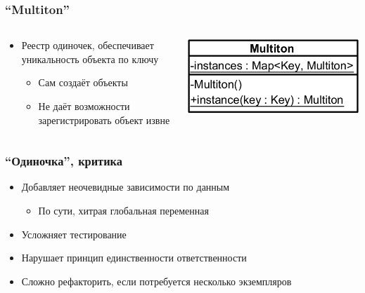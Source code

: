 \documentclass{../cscslides}
\begin{document}
    \begin{frame}
        \frametitle{``Multiton''}
        \begin{columns}
            \begin{column}{0.6\textwidth}
                \begin{itemize}
                    \item Реестр одиночек, обеспечивает уникальность объекта по ключу
                    \begin{itemize}
                        \item Сам создаёт объекты
                        \item Не даёт возможности зарегистрировать объект извне
                    \end{itemize}
                \end{itemize}
            \end{column}
            \begin{column}{0.4\textwidth}
                \includegraphics[width=\textwidth]{multiton.png}
            \end{column}
        \end{columns}
    \end{frame}

    \begin{frame}
        \frametitle{``Одиночка'', критика}
        \begin{itemize}
            \item Добавляет неочевидные зависимости по данным
            \begin{itemize}
                \item По сути, хитрая глобальная переменная
            \end{itemize}
            \item Усложняет тестирование
            \item Нарушает принцип единственности ответственности
            \item Сложно рефакторить, если потребуется несколько экземпляров
        \end{itemize}
    \end{frame}
\end{document}
